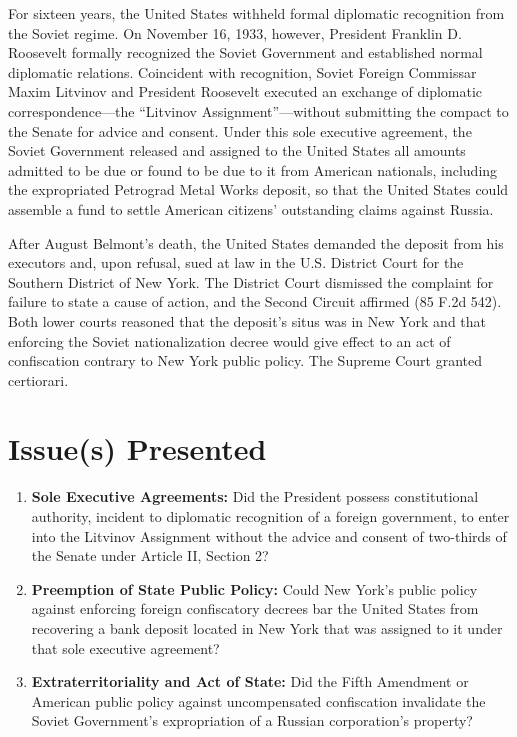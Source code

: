 \documentclass[12pt]{article}
\begin{document}
For sixteen years, the United States withheld formal diplomatic recognition from the Soviet regime. On November 16, 1933, however, President Franklin D. Roosevelt formally recognized the Soviet Government and established normal diplomatic relations. Coincident with recognition, Soviet Foreign Commissar Maxim Litvinov and President Roosevelt executed an exchange of diplomatic correspondence---the ``Litvinov Assignment''---without submitting the compact to the Senate for advice and consent. Under this sole executive agreement, the Soviet Government released and assigned to the United States all amounts admitted to be due or found to be due to it from American nationals, including the expropriated Petrograd Metal Works deposit, so that the United States could assemble a fund to settle American citizens' outstanding claims against Russia.

After August Belmont's death, the United States demanded the deposit from his executors and, upon refusal, sued at law in the U.S. District Court for the Southern District of New York. The District Court dismissed the complaint for failure to state a cause of action, and the Second Circuit affirmed (85 F.2d 542). Both lower courts reasoned that the deposit's situs was in New York and that enforcing the Soviet nationalization decree would give effect to an act of confiscation contrary to New York public policy. The Supreme Court granted certiorari.

\section{Issue(s) Presented}

\begin{enumerate}
  \item \textbf{Sole Executive Agreements:} Did the President possess constitutional authority, incident to diplomatic recognition of a foreign government, to enter into the Litvinov Assignment without the advice and consent of two-thirds of the Senate under Article II, Section 2?
  \item \textbf{Preemption of State Public Policy:} Could New York's public policy against enforcing foreign confiscatory decrees bar the United States from recovering a bank deposit located in New York that was assigned to it under that sole executive agreement?
  \item \textbf{Extraterritoriality and Act of State:} Did the Fifth Amendment or American public policy against uncompensated confiscation invalidate the Soviet Government's expropriation of a Russian corporation's property?
\end{enumerate}
\end{document}
